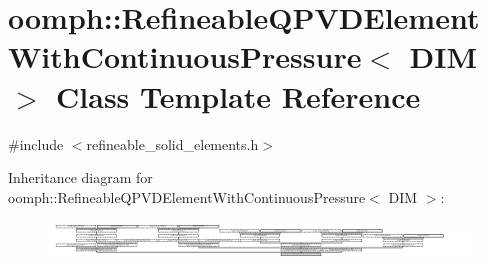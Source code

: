 \hypertarget{classoomph_1_1RefineableQPVDElementWithContinuousPressure}{}\section{oomph\+:\+:Refineable\+Q\+P\+V\+D\+Element\+With\+Continuous\+Pressure$<$ D\+IM $>$ Class Template Reference}
\label{classoomph_1_1RefineableQPVDElementWithContinuousPressure}


{\ttfamily \#include $<$refineable\+\_\+solid\+\_\+elements.\+h$>$}

Inheritance diagram for oomph\+:\+:Refineable\+Q\+P\+V\+D\+Element\+With\+Continuous\+Pressure$<$ D\+IM $>$\+:\begin{figure}[H]
\begin{center}
\leavevmode
\includegraphics[height=1.010309cm]{classoomph_1_1RefineableQPVDElementWithContinuousPressure}
\end{center}
\end{figure}
